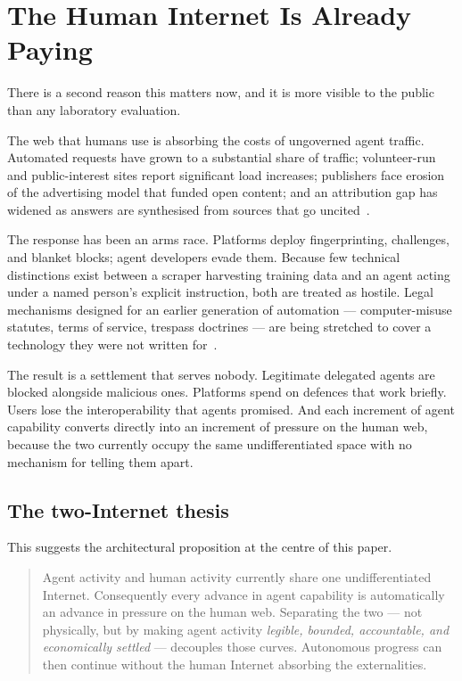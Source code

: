 \documentclass[11pt]{article}
\begin{document}
\section{The Human Internet Is Already Paying}

There is a second reason this matters now, and it is more visible to the public
than any laboratory evaluation.

The web that humans use is absorbing the costs of ungoverned agent traffic.
Automated requests have grown to a substantial share of traffic; volunteer-run
and public-interest sites report significant load increases; publishers face
erosion of the advertising model that funded open content; and an attribution
gap has widened as answers are synthesised from sources that go
uncited~\cite{pattison2026}.

The response has been an arms race. Platforms deploy fingerprinting, challenges,
and blanket blocks; agent developers evade them. Because few technical
distinctions exist between a scraper harvesting training data and an agent acting
under a named person's explicit instruction, both are treated as hostile. Legal
mechanisms designed for an earlier generation of automation --- computer-misuse
statutes, terms of service, trespass doctrines --- are being stretched to cover
a technology they were not written for~\cite{pattison2026}.

The result is a settlement that serves nobody. Legitimate delegated agents are
blocked alongside malicious ones. Platforms spend on defences that work briefly.
Users lose the interoperability that agents promised. And each increment of agent
capability converts directly into an increment of pressure on the human web,
because the two currently occupy the same undifferentiated space with no
mechanism for telling them apart.

\subsection{The two-Internet thesis}

This suggests the architectural proposition at the centre of this paper.

\begin{quote}
Agent activity and human activity currently share one undifferentiated Internet.
Consequently every advance in agent capability is automatically an advance in
pressure on the human web. Separating the two --- not physically, but by making
agent activity \emph{legible, bounded, accountable, and economically settled}
--- decouples those curves. Autonomous progress can then continue without the
human Internet absorbing the externalities.
\end{quote}
\end{document}
